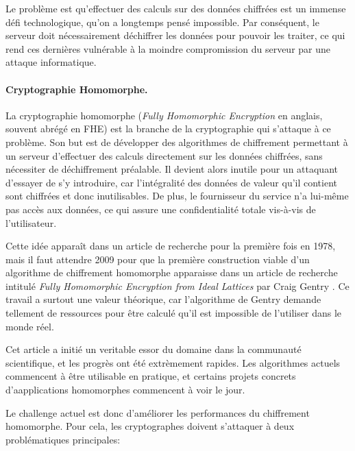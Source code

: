 Le problème est qu'effectuer des calculs sur des données chiffrées est un immense défi technologique, qu'on a longtemps pensé impossible. Par conséquent, le serveur doit nécessairement déchiffrer les données pour pouvoir les traiter, ce qui rend ces dernières vulnérable à la moindre compromission du serveur par une attaque informatique.


\paragraph{Cryptographie Homomorphe.}
La cryptographie homomorphe (\textit{Fully Homomorphic Encryption} en anglais, souvent abrégé en FHE) est la branche de la cryptographie qui s'attaque à ce problème. Son but est de développer des algorithmes de chiffrement permettant à un serveur d'effectuer des calculs directement sur les données chiffrées, sans nécessiter de déchiffrement préalable. Il devient alors inutile pour un attaquant d'essayer de s'y introduire, car l'intégralité des données de valeur qu'il contient sont chiffrées et donc inutilisables. De plus, le fournisseur du service n'a lui-même pas accès aux données, ce qui assure une confidentialité totale vis-à-vis de l'utilisateur.

Cette idée apparaît dans un article de recherche pour la première fois en 1978, mais il faut attendre 2009 pour que la première construction viable d'un algorithme de chiffrement homomorphe apparaisse dans un article de recherche intitulé \textit{Fully Homomorphic Encryption from Ideal Lattices} par Craig Gentry \cite{STOC:Gentry09}. Ce travail a surtout une valeur théorique, car l'algorithme de Gentry demande tellement de ressources pour être calculé qu'il est impossible de l'utiliser dans le monde réel.

Cet article a initié un veritable essor du domaine dans la communauté scientifique, et les progrès ont été extrèmement rapides. Les algorithmes actuels commencent à être utilisable en pratique, et certains projets concrets d'aapplications homomorphes commencent à voir le jour.

Le challenge actuel est donc d'améliorer les performances du chiffrement homomorphe. Pour cela, les cryptographes doivent s'attaquer à deux problématiques principales:


